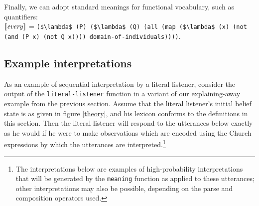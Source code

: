 \documentclass[pdfextras]{handbook}
\newcommand{\llbracket}{\ensuremath{\left [\!\left [}}%
\newcommand{\rrbracket}{\ensuremath{\right ]\!\right ]}}
\providecommand{\sv}[1]{\ensuremath{\llbracket \mathit{#1} \rrbracket}}
\begin{document}

Finally, we can adopt standard meanings for functional vocabulary, such as quantifiers: \\
\sv{every} = \lstinline[mathescape]{($\lambda$ (P) ($\lambda$ (Q) (all (map ($\lambda$ (x) (not (and (P x) (not Q x)))) domain-of-individuals))))}.

\subsection{Example interpretations}

As an example of sequential interpretation by a literal listener, consider the output of the \lstinline{literal-listener} function in a variant of our explaining-away example from the previous section. 
Assume that the literal listener's initial belief state is as given in figure \ref{theory}, and his lexicon conforms to the definitions in this section. 
Then the literal listener will respond to the utterances below exactly as he would if he were to make observations which are encoded using the Church expressions by which the utterances are interpreted.\footnote{The interpretations below are examples of high-probability interpretations that will be generated by the \lstinline{meaning} function as applied to these utterances; other interpretations may also be possible, depending on the parse and composition operators used.}
\end{document}
